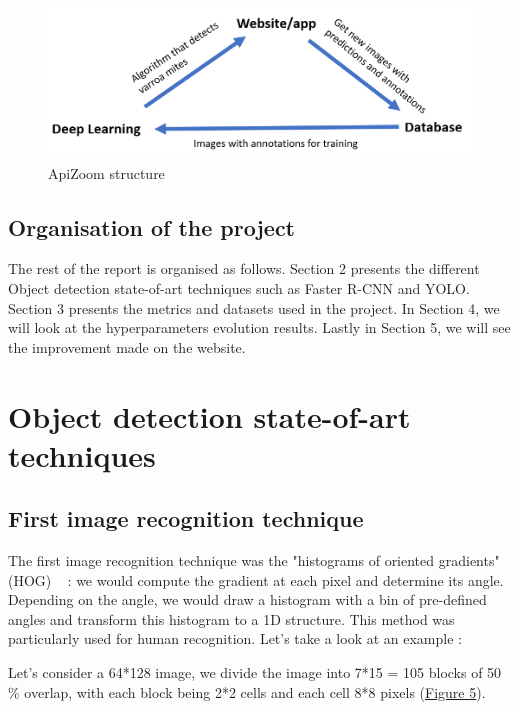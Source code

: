 \documentclass{article}
\begin{document}
\begin{figure}[!ht]
  \centering
  \includegraphics[scale = 0.5]{triangle.png}
  \caption{ApiZoom structure}
  \label{Figure 4}
\end{figure}

\subsection{Organisation of the project}

The rest of the report is organised as follows. Section 2 presents the different Object detection state-of-art techniques such as Faster R-CNN and YOLO.
Section 3 presents the metrics and datasets used in the project.
In Section 4, we will look at the hyperparameters evolution results. Lastly in Section 5, we will see the improvement made on the website.  




\newpage
\section{Object detection state-of-art techniques}

\subsection{First image recognition technique}

The first image recognition technique was the "histograms of oriented gradients" (HOG) ~\cite{dalal2005histograms} : we would compute the gradient at each pixel and determine its angle. Depending on the angle, we would draw a histogram with a bin of pre-defined angles and transform this histogram to a 1D structure. This method was particularly used for human recognition. Let's take a look at an example : 

Let's consider a 64*128 image, we divide the image into 7*15 = 105 blocks of 50 \% overlap, with each block being 2*2 cells and each cell 8*8 pixels (\hyperref[Figure 5]{Figure 5}). 
\end{document}
